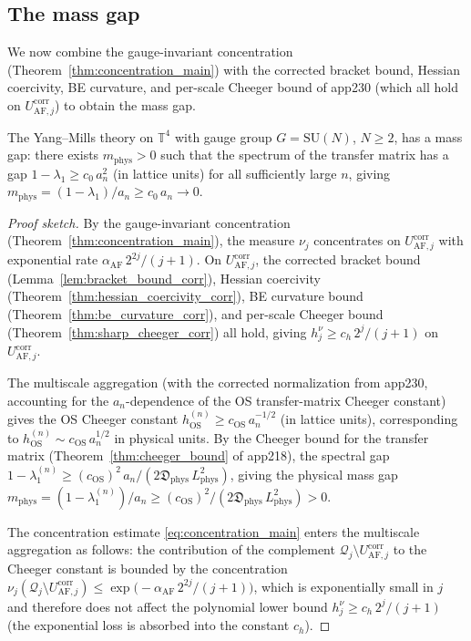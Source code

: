 \subsection{The mass gap}
\label{ssec:app231_mass_gap}

We now combine the gauge-invariant concentration
(Theorem~\ref{thm:concentration_main}) with the corrected bracket
bound, Hessian coercivity, BE curvature, and per-scale Cheeger bound
of app230 (which all hold on $U_{\mathrm{AF},j}^{\mathrm{corr}}$) to
obtain the mass gap.

\begin{theorem}
\label{thm:mass_gap_app231}
The Yang--Mills theory on $\mathbb{T}^{4}$ with gauge group
$G=\mathrm{SU}(N)$, $N\ge 2$, has a mass gap: there exists
$m_{\mathrm{phys}}>0$ such that the spectrum of the transfer matrix
has a gap $1-\lambda_{1}\ge c_{0}\,a_{n}^{2}$ (in lattice units) for
all sufficiently large $n$, giving
$m_{\mathrm{phys}}=(1-\lambda_{1})/a_{n}\ge c_{0}\,a_{n}\to 0$.
\end{theorem}

\begin{proof}[Proof sketch]
By the gauge-invariant concentration
(Theorem~\ref{thm:concentration_main}), the measure $\nu_{j}$
concentrates on $U_{\mathrm{AF},j}^{\mathrm{corr}}$ with exponential
rate $\alpha_{\mathrm{AF}}\,2^{2j}/(j+1)$. On
$U_{\mathrm{AF},j}^{\mathrm{corr}}$, the corrected bracket bound
(Lemma~\ref{lem:bracket_bound_corr}), Hessian coercivity
(Theorem~\ref{thm:hessian_coercivity_corr}), BE curvature bound
(Theorem~\ref{thm:be_curvature_corr}), and per-scale Cheeger bound
(Theorem~\ref{thm:sharp_cheeger_corr}) all hold, giving
$h_{j}^{\nu}\ge c_{h}\,2^{j}/(j+1)$ on
$U_{\mathrm{AF},j}^{\mathrm{corr}}$.

The multiscale aggregation (with the corrected normalization from
app230, accounting for the $a_{n}$-dependence of the OS transfer-matrix
Cheeger constant) gives the OS Cheeger constant
$h_{\mathrm{OS}}^{(n)}\ge c_{\mathrm{OS}}\,a_{n}^{-1/2}$ (in lattice
units), corresponding to $h_{\mathrm{OS}}^{(n)}\sim c_{\mathrm{OS}}\,
a_{n}^{1/2}$ in physical units. By the Cheeger bound for the transfer
matrix (Theorem~\ref{thm:cheeger_bound} of app218), the spectral gap
$1-\lambda_{1}^{(n)}\ge(c_{\mathrm{OS}})^{2}\,a_{n}/(2\mathfrak{D}_{
\mathrm{phys}}\,L_{\mathrm{phys}}^{2})$, giving the physical mass gap
$m_{\mathrm{phys}}=(1-\lambda_{1}^{(n)})/a_{n}\ge(c_{\mathrm{OS}})^{
2}/(2\mathfrak{D}_{\mathrm{phys}}\,L_{\mathrm{phys}}^{2})>0$.

The concentration estimate \eqref{eq:concentration_main} enters the
multiscale aggregation as follows: the contribution of the complement
$\mathcal{Q}_{j}\setminus U_{\mathrm{AF},j}^{\mathrm{corr}}$ to the
Cheeger constant is bounded by the concentration
$\nu_{j}(\mathcal{Q}_{j}\setminus U_{\mathrm{AF},j}^{\mathrm{corr}})
\le\exp\!\bigl(-\alpha_{\mathrm{AF}}\,2^{2j}/(j+1)\bigr)$, which is
exponentially small in $j$ and therefore does not affect the
polynomial lower bound $h_{j}^{\nu}\ge c_{h}\,2^{j}/(j+1)$ (the
exponential loss is absorbed into the constant $c_{h}$).
\end{proof}

